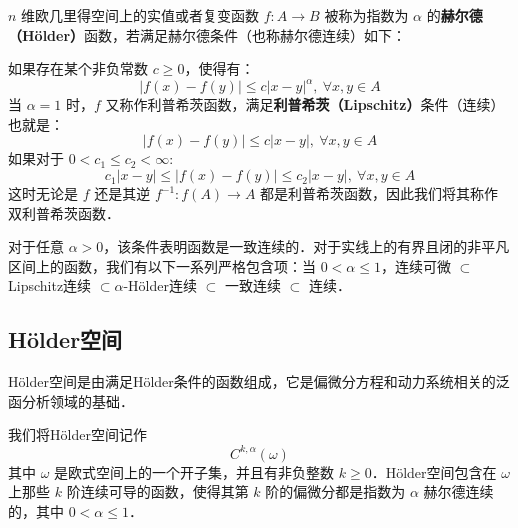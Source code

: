 \begin{issues}
\issueDraft
\end{issues}
$n$ 维欧几里得空间上的实值或者复变函数 $f:A \rightarrow B$ 被称为指数为 $\alpha$ 的\textbf{赫尔德（Hölder）}函数，若满足赫尔德条件（也称赫尔德连续）如下：

如果存在某个非负常数 $c\geq 0$，使得有：
\begin{equation}
|f(x)-f(y)|\leq c|x-y|^\alpha,\ \forall x,y \in A
\end{equation}
当 $\alpha=1$ 时，$f$ 又称作利普希茨函数，满足\textbf{利普希茨（Lipschitz）}条件（连续）也就是：
\begin{equation}
|f(x)-f(y)|\leq c|x-y|,\ \forall x,y \in A
\end{equation}
如果对于 $0<c_1\leq c_2<\infty $:
\begin{equation}
c_1|x-y|\leq |f(x)-f(y)|\leq  c_2|x-y|,\ \forall x,y \in A
\end{equation}
这时无论是 $f$ 还是其逆 $f^{-1}:f(A)\rightarrow A$ 都是利普希茨函数，因此我们将其称作双利普希茨函数．

对于任意 $\alpha > 0$，该条件表明函数是一致连续的．对于实线上的有界且闭的非平凡区间上的函数，我们有以下一系列严格包含项：当 $0<\alpha\leq 1$，连续可微 $\subset$Lipschitz连续 $\subset\alpha$-Hölder连续 $\subset$ 一致连续 $\subset$ 连续．
\subsection{Hölder空间}
Hölder空间是由满足Hölder条件的函数组成，它是偏微分方程和动力系统相关的泛函分析领域的基础．

我们将Hölder空间记作
\begin{equation}
C^{k,\alpha}(\omega)
\end{equation}
其中 $\omega$ 是欧式空间上的一个开子集，并且有非负整数 $k\geq 0$．Hölder空间包含在 $\omega$ 上那些 $k$ 阶连续可导的函数，使得其第 $k$ 阶的偏微分都是指数为 $\alpha$ 赫尔德连续的，其中 $0<\alpha\leq 1$．
